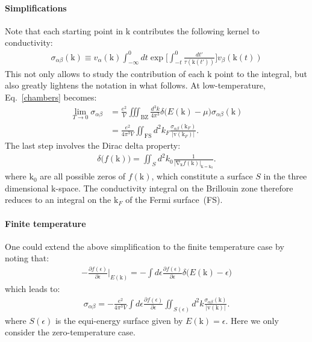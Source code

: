 \documentclass[aps,twocolumn,showpacs,nofootinbib]{revtex4-1}
\renewcommand{\vec}[1]{\bm{\mathrm{#1}}}
\begin{document}
\paragraph*{Simplifications} Note that each starting point in $\vec k$ contributes the following kernel to conductivity:
\begin{align}
\sigma_{\alpha\beta}(\vec k) \equiv
v_{\alpha}(\vec k)
\int_{-\infty}^{0}dt \exp\bigg[\int_{-t}^{0}\frac{dt'}{\tau(\vec k(t'))}\bigg] v_{\beta}(\vec k(t))
\end{align}
This not only allows to study the contribution of each $\vec k$ point to the integral, but also greatly lightens the notation in what follows. At low-temperature, Eq.~\ref{chambers} becomes:
\begin{align}
\lim_{T\rightarrow0}\sigma_{\alpha\beta} 
&=
\frac{e^2}{V}\iiint_{\text{BZ}}\frac{d^3k}{4\pi^3}
\delta\big(E(\vec k) - \mu\big)
\sigma_{\alpha\beta}(\vec k)
\\
&=\boxed{
\frac{e^2}{4\pi^3V}\iint_{\text{FS}}d^2k_F
\frac{\sigma_{\alpha\beta}(\vec k_F)}{|\vec v(\vec k_F)|}
}.
\label{zeroTemperature}
\end{align}
The last step involves the Dirac delta property:
\begin{align}
\delta\big(f(\vec k)\big)=\iint_{S} d^2 k_0 \frac{1}{|\vec \nabla_{\vec k} f(\vec k)|_{\vec k=\vec k_0}}.
\end{align}
where $\vec k_0$ are all possible zeros of $f(\vec k)$, which constitute a surface $S$ in the three dimensional $\vec k$-space. The conductivity integral on the Brillouin zone therefore reduces to an integral on the $\vec k_F$ of the Fermi surface~(FS).

\paragraph*{Finite temperature} One could extend the above simplification to the finite temperature case by noting that:
\begin{align}
-\frac{\partial f(\epsilon)}{\partial \epsilon}
\bigg|_{E(\vec k)}
=
-\int d\epsilon \frac{\partial f(\epsilon)}{\partial \epsilon} \delta\big(E(\vec k) - \epsilon\big)
\end{align}
which leads to:
\begin{align}
\boxed{
\sigma_{\alpha\beta}
=
-\frac{e^2}{4\pi^3V} 
\int d\epsilon
\frac{\partial f(\epsilon)}{\partial \epsilon}
\iint_{S(\epsilon)}d^2k
\frac{\sigma_{\alpha\beta}(\vec k)}{|\vec v(\vec k)|}
}.
\label{finiteTemperature}
\end{align}
where $S(\epsilon)$ is the equi-energy surface given by $E(\vec k)=\epsilon$. Here we only consider the zero-temperature case.
\end{document}
